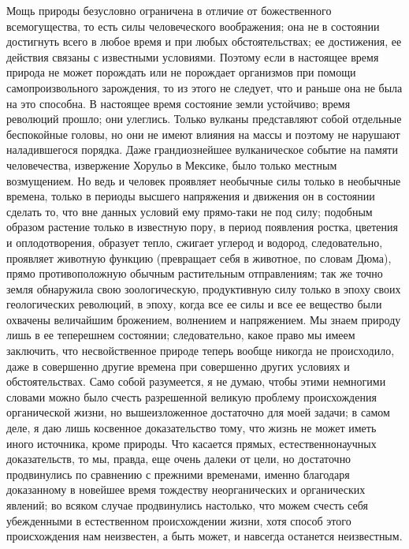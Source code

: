 \documentclass[12pt,oneside]{book}
\begin{document}
Мощь природы безусловно ограничена в отличие от божественного всемогущества, то есть силы человеческого воображения; она не в состоянии достигнуть всего в любое время и при любых обстоятельствах; ее достижения, ее действия связаны с известными условиями. Поэтому если в настоящее время природа не может порождать или не порождает организмов при помощи самопроизвольного зарождения, то из этого не следует, что и раньше она не была на это способна. В настоящее время состояние земли устойчиво; время революций прошло; они улеглись. Только вулканы представляют собой отдельные беспокойные головы, но они не имеют влияния на массы и поэтому не нарушают наладившегося порядка. Даже грандиознейшее вулканическое событие на памяти человечества, извержение Хорульо в Мексике, было только местным возмущением. Но ведь и человек проявляет необычные силы только в необычные времена, только в периоды высшего напряжения и движения он в состоянии сделать то, что вне данных условий ему прямо-таки не под силу; подобным образом растение только в известную пору, в период появления ростка, цветения и оплодотворения, образует тепло, сжигает углерод и водород, следовательно, проявляет животную функцию (превращает себя в животное, по словам Дюма), прямо противоположную обычным растительным отправлениям; так же точно земля обнаружила свою зоологическую, продуктивную силу только в эпоху своих геологических революций, в эпоху, когда все ее силы и все ее вещество были охвачены величайшим брожением, волнением и напряжением. Мы знаем природу лишь в ее теперешнем состоянии; следовательно, какое право мы имеем заключить, что несвойственное природе теперь вообще никогда не происходило, даже в совершенно другие времена при совершенно других условиях и обстоятельствах. Само собой разумеется, я не думаю, чтобы этими немногими словами можно было счесть разрешенной великую проблему происхождения органической жизни, но вышеизложенное достаточно для моей задачи; в самом деле, я даю лишь косвенное доказательство тому, что жизнь не может иметь иного источника, кроме природы. Что касается прямых, естественнонаучных доказательств, то мы, правда, еще очень далеки от цели, но достаточно продвинулись по сравнению с прежними временами, именно благодаря доказанному в новейшее время тождеству неорганических и органических явлений; во всяком случае продвинулись настолько, что можем счесть себя убежденными в естественном происхождении жизни, хотя способ этого происхождения нам неизвестен, а быть может, и навсегда останется неизвестным.
\end{document}
